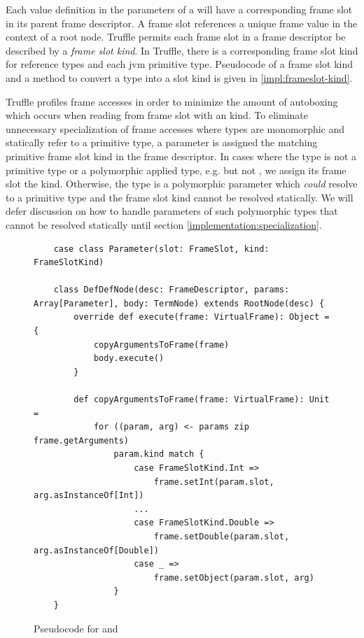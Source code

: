 Each value definition in the parameters of a  will have a corresponding frame slot in its parent frame descriptor. 
A frame slot references a unique frame value in the context of a root node.
Truffle permits each frame slot in a frame descriptor be described by a \textit{frame slot kind}.
In Truffle, there is a corresponding frame slot kind for reference types and each \acrshort{jvm} primitive type. 
Pseudocode of a frame slot kind and a method to convert a type into a slot kind is given in \ref{impl:frameslot-kind}.

Truffle profiles frame accesses in order to minimize the amount of autoboxing which occurs when reading from frame slot with an  kind. 
To eliminate unnecessary specialization of frame accesses where types are monomorphic and statically refer to a primitive type, a parameter is assigned the matching primitive frame slot kind in the frame descriptor. 
In cases where the type is not a primitive type or a polymorphic applied type, e.g.  but not , we assign its frame slot the  kind.
Otherwise, the type is a polymorphic parameter which \textit{could} resolve to a primitive type and the frame slot kind cannot be resolved statically.
We will defer discussion on how to handle parameters of such polymorphic types that cannot be resolved statically until section \ref{implementation:specialization}.


\begin{figure}[!htb]
	\begin{verbatim}
	case class Parameter(slot: FrameSlot, kind: FrameSlotKind)
		
	class DefDefNode(desc: FrameDescriptor, params: Array[Parameter], body: TermNode) extends RootNode(desc) {
		override def execute(frame: VirtualFrame): Object = {
			copyArgumentsToFrame(frame)
			body.execute()
		}	
			
		def copyArgumentsToFrame(frame: VirtualFrame): Unit = 
			for ((param, arg) <- params zip frame.getArguments) 
				param.kind match {
					case FrameSlotKind.Int =>
						frame.setInt(param.slot, arg.asInstanceOf[Int])
					...
					case FrameSlotKind.Double =>
						frame.setDouble(param.slot, arg.asInstanceOf[Double])	
					case _ =>
						frame.setObject(param.slot, arg)
				}
	}
	\end{verbatim}
	\caption{Pseudocode for  and }
	\label{impl:defdefnode}
\end{figure}

